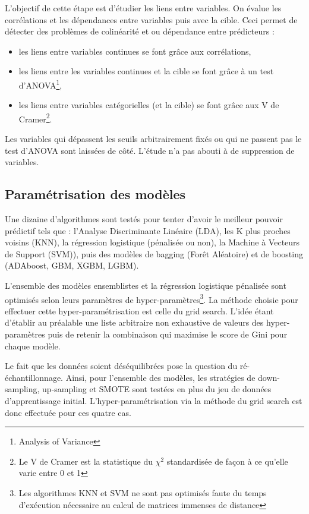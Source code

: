 \documentclass[french]{article}
\begin{document}
\begin{multicols}{2}
L'objectif de cette étape est d'étudier les liens entre variables. On évalue les corrélations et les dépendances entre variables puis avec la cible. Ceci permet de détecter des problèmes de colinéarité et ou dépendance entre prédicteurs :

\begin{itemize}
    \item les liens entre variables continues se font grâce aux corrélations,
    \item les liens entre les variables continues et la cible se font grâce à un test d'ANOVA\footnote{Analysis of Variance},
    \item les liens entre variables catégorielles (et la cible) se font grâce aux V de Cramer\footnote{Le V de Cramer est la statistique du $\chi^2$ standardisée de façon à ce qu'elle varie entre 0 et 1}.
\end{itemize}

Les variables qui dépassent les seuils arbitrairement fixés ou qui ne passent pas le test d'ANOVA sont laissées de côté. L'étude n'a pas abouti à de suppression de variables.

\subsection{Paramétrisation des modèles}

Une dizaine d'algorithmes sont testés pour tenter d'avoir le meilleur pouvoir prédictif tels que : l'Analyse Discriminante Linéaire (LDA), les K plus proches voisins (KNN), la régression logistique (pénalisée ou non), la Machine à Vecteurs de Support (SVM)), puis des modèles de bagging (Forêt Aléatoire) et de boosting (ADAboost, GBM, XGBM, LGBM).

L'ensemble des modèles ensemblistes et la régression logistique pénalisée sont optimisés selon leurs paramètres de hyper-paramètres\footnote{Les algorithmes KNN et SVM ne sont pas optimisés faute du temps d'exécution nécessaire au calcul de matrices immenses de distance}. La méthode choisie pour effectuer cette hyper-paramétrisation est celle du \og grid search\fg. L'idée étant d'établir au préalable une liste arbitraire non exhaustive de valeurs des hyper-paramètres puis de retenir la combinaison qui maximise le score de Gini pour chaque modèle. 

Le fait que les données soient déséquilibrées pose la question du ré-échantillonnage. Ainsi, pour l'ensemble des modèles, les stratégies de down-sampling, up-sampling et SMOTE sont testées en plus du jeu de données d'apprentissage initial. L'hyper-paramétrisation via la méthode du \og grid search \fg est donc effectuée pour ces quatre cas.




\end{multicols}
\end{document}
